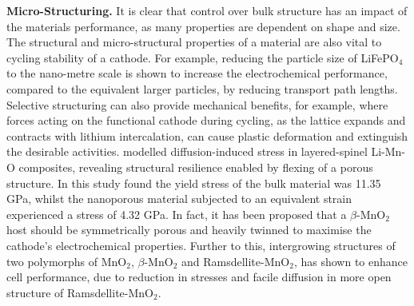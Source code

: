 \documentclass[../main.tex]{subfiles}
\begin{document}
\textbf{Micro-Structuring.} It is clear that control over bulk structure has an impact of the materials performance, as many properties are dependent on shape and size. \cite{bruce2008nanomaterials} The structural and micro-structural properties of a material are also vital to cycling stability of a cathode. For example, reducing the particle size of LiFePO$_4$ to the nano-metre scale is shown to increase the electrochemical performance, compared to the equivalent larger particles, by reducing transport path lengths. \cite{franger2006chemistry, ellis2007synthesis,malik2010particle} Selective structuring can also provide mechanical benefits, for example, where forces acting on the functional cathode during cycling, as the lattice expands and contracts with lithium intercalation, can cause plastic deformation and extinguish the desirable activities. \citeauthor{sayle2018stress} modelled diffusion-induced stress in layered-spinel Li-Mn-O composites, revealing structural resilience enabled by flexing of a porous structure. \cite{sayle2018stress} In this study \citeauthor{sayle2018stress} found the yield stress of the bulk material was 11.35 GPa, whilst the nanoporous material subjected to an equivalent strain experienced a stress of 4.32 GPa. In fact, it has been proposed that a $\beta$-MnO$_2$ host should be symmetrically porous and heavily twinned to maximise the cathode's electrochemical properties. \cite{sayle2009predicting} Further to this, intergrowing structures of two polymorphs of MnO$_2$, $\beta$-MnO$_2$ and Ramsdellite-MnO$_2$,\cite{Gupta2018} has shown to enhance cell performance,\cite{GUPTA2020227619} due to reduction in stresses and facile diffusion in more open structure of Ramsdellite-MnO$_2$.

\end{document}
